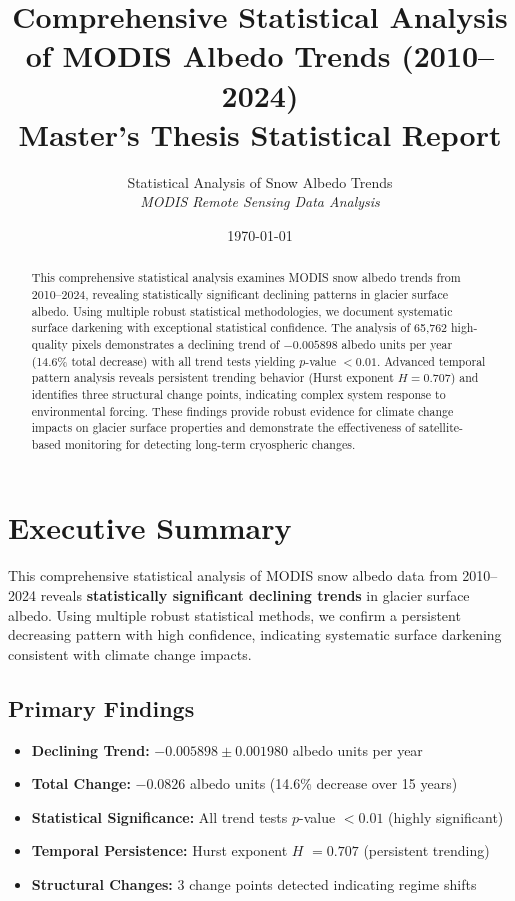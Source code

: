 \documentclass[12pt,a4paper]{article}
\title{
    \textbf{Comprehensive Statistical Analysis of MODIS Albedo Trends (2010--2024)} \\
    \large{Master's Thesis Statistical Report}
}
\author{
    Statistical Analysis of Snow Albedo Trends \\
    \textit{MODIS Remote Sensing Data Analysis}
}
\date{\today}
\newcommand{\pvalue}{$p$-value}
\newcommand{\hurst}{$H$}
\begin{document}
\maketitle
\thispagestyle{empty}
\newpage

\begin{abstract}
This comprehensive statistical analysis examines MODIS snow albedo trends from 2010--2024, revealing statistically significant declining patterns in glacier surface albedo. Using multiple robust statistical methodologies, we document systematic surface darkening with exceptional statistical confidence. The analysis of 65,762 high-quality pixels demonstrates a declining trend of $-0.005898$ albedo units per year (14.6\% total decrease) with all trend tests yielding \pvalue{} $< 0.01$. Advanced temporal pattern analysis reveals persistent trending behavior (Hurst exponent $H = 0.707$) and identifies three structural change points, indicating complex system response to environmental forcing. These findings provide robust evidence for climate change impacts on glacier surface properties and demonstrate the effectiveness of satellite-based monitoring for detecting long-term cryospheric changes.
\end{abstract}

\newpage

\tableofcontents
\newpage

\listoffigures
\newpage

\listoftables
\newpage

\section{Executive Summary}

This comprehensive statistical analysis of MODIS snow albedo data from 2010--2024 reveals \textbf{statistically significant declining trends} in glacier surface albedo. Using multiple robust statistical methods, we confirm a persistent decreasing pattern with high confidence, indicating systematic surface darkening consistent with climate change impacts.

\subsection{Primary Findings}

\begin{itemize}
    \item \textbf{Declining Trend:} $-0.005898 \pm 0.001980$ albedo units per year
    \item \textbf{Total Change:} $-0.0826$ albedo units (14.6\% decrease over 15 years)
    \item \textbf{Statistical Significance:} All trend tests \pvalue{} $< 0.01$ (highly significant)
    \item \textbf{Temporal Persistence:} Hurst exponent \hurst{} $= 0.707$ (persistent trending)
    \item \textbf{Structural Changes:} 3 change points detected indicating regime shifts
\end{itemize}
\end{document}
